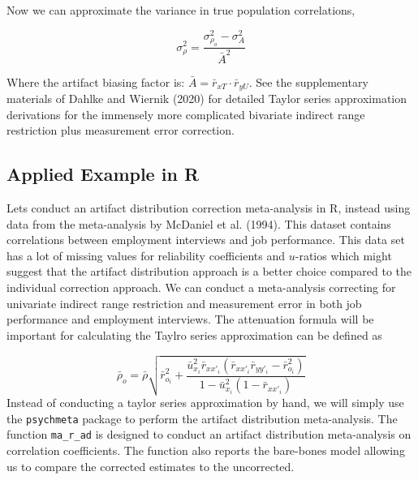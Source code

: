 \documentclass[
  letterpaper,
  DIV=11,
  numbers=noendperiod]{scrreprt}
\begin{document}
Now we can approximate the variance in true population correlations,

\[
\sigma_\rho^2= \frac{\sigma^2_{\rho_o} - \sigma^2_A}{\bar{A}^2}
\]

Where the artifact biasing factor is:
\(\bar{A}=\bar{r}_{xT}\cdot \bar{r}_{yU}\). See the supplementary
materials of Dahlke and Wiernik (2020) for detailed Taylor series
approximation derivations for the immensely more complicated bivariate
indirect range restriction plus measurement error correction.

\hypertarget{applied-example-in-r-17}{%
\subsection{Applied Example in R}\label{applied-example-in-r-17}}

Lets conduct an artifact distribution correction meta-analysis in R,
instead using data from the meta-analysis by McDaniel et al. (1994).
This dataset contains correlations between employment interviews and job
performance. This data set has a lot of missing values for reliability
coefficients and \(u\)-ratios which might suggest that the artifact
distribution approach is a better choice compared to the individual
correction approach. We can conduct a meta-analysis correcting for
univariate indirect range restriction and measurement error in both job
performance and employment interviews. The attenuation formula will be
important for calculating the Taylro series approximation can be defined
as

\[
\bar{\rho}_o=\bar{\rho}\sqrt{\bar{r}_{o_i}^2 + \frac{\bar{u}_{x_i}^2 \bar{r}_{xx'_i}(\bar{r}_{xx'_i}\bar{r}_{yy'_i} - \bar{r}_{o_i}^2) }{1 - \bar{u}_{x_i}^2 (1-\bar{r}_{xx'_i})} }
\] Instead of conducting a taylor series approximation by hand, we will
simply use the \texttt{psychmeta} package to perform the artifact
distribution meta-analysis. The function \texttt{ma\_r\_ad} is designed
to conduct an artifact distribution meta-analysis on correlation
coefficients. The function also reports the bare-bones model allowing us
to compare the corrected estimates to the uncorrected.
\end{document}
